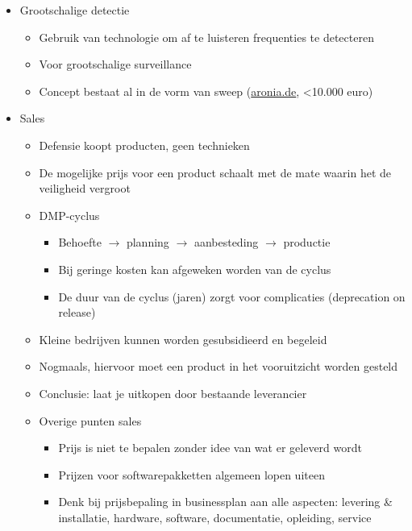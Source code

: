 \documentclass[12pt, a4paper]{article}
\begin{document}
\begin{itemize}
\begin{itemize}
        \item Grootschalige detectie
        \begin{itemize}
            \item Gebruik van technologie om af te luisteren frequenties te detecteren
            \item Voor grootschalige surveillance
            \item Concept bestaat al in de vorm van sweep (\url{aronia.de}, <10.000 euro)
        \end{itemize}

        \item Sales
        \begin{itemize}
            \item Defensie koopt producten, geen technieken
            \item De mogelijke prijs voor een product schaalt met de mate waarin het de veiligheid vergroot
            \item DMP-cyclus

            \begin{itemize}
                \item Behoefte $\rightarrow$ planning $\rightarrow$ aanbesteding $\rightarrow$ productie
                \item Bij geringe kosten kan afgeweken worden van de cyclus
                \item De duur van de cyclus (jaren) zorgt voor complicaties (deprecation on release)
            \end{itemize}

            \item Kleine bedrijven kunnen worden gesubsidieerd en begeleid
            \item Nogmaals, hiervoor moet een product in het vooruitzicht worden gesteld
            \item Conclusie: laat je uitkopen door bestaande leverancier

            \item Overige punten sales
            \begin{itemize}
                \item Prijs is niet te bepalen zonder idee van wat er geleverd wordt
                \item Prijzen voor softwarepakketten algemeen lopen uiteen
                \item Denk bij prijsbepaling in businessplan aan alle aspecten: levering \& installatie, hardware, software, documentatie, opleiding, service
            \end{itemize}
        \end{itemize}


\end{itemize}
\end{itemize}
\end{document}
